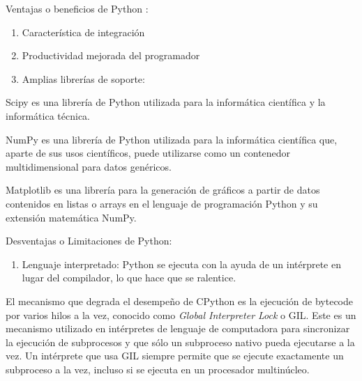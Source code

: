 Ventajas o beneficios de Python \parencite{PythonVentajas}:
\begin{enumerate}
\item  Característica de integración
\item  Productividad mejorada del programador
\item  Amplias librerías de soporte:
\end{enumerate}

Scipy es una librería de Python utilizada para la informática científica y la informática técnica. \newline

NumPy es una librería de Python utilizada para la informática científica que, aparte de sus usos científicos, puede utilizarse como un contenedor multidimensional para datos genéricos.\newline

Matplotlib es una librería para la generación de gráficos a partir de datos contenidos en listas o arrays en el lenguaje de programación Python y su extensión matemática NumPy.\newline

Desventajas o Limitaciones de Python:
\begin{enumerate}
\item  Lenguaje interpretado: Python se ejecuta con la ayuda de un intérprete en lugar del compilador, lo que hace que se ralentice.
\end{enumerate}

El mecanismo que degrada el desempeño de CPython es la ejecución de bytecode por varios hilos a la vez, conocido como \textit{Global Interpreter Lock} o GIL. Este es un mecanismo utilizado en intérpretes de lenguaje de computadora para sincronizar la ejecución de subprocesos y que sólo un subproceso nativo pueda ejecutarse a la vez. Un intérprete que usa GIL siempre permite que se ejecute exactamente un subproceso a la vez, incluso si se ejecuta en un procesador multinúcleo.

